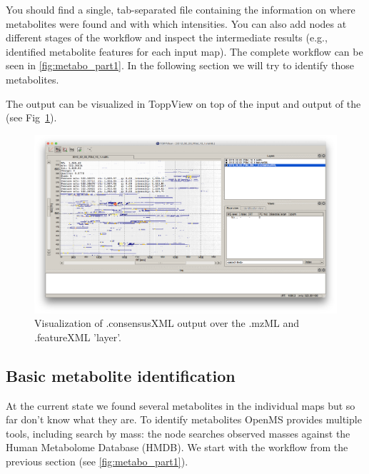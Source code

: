 You should find a single, tab-separated file containing the information on where metabolites were found and with which intensities.
You can also add  nodes at different stages of the workflow and inspect the intermediate results (e.g., identified metabolite features for each input map).
The complete workflow can be seen in \cref{fig:metabo_part1}.
In the following section we will try to identify those metabolites.

\noindent The  output can be visualized in ToppView on top of the input and output of the  (see Fig~\ref{fig:ToppView_5}). 

\begin{figure}[htbp]
  \centering
  \includegraphics[width=\textwidth]{graphics/metabo/ToppView_5.png}
  \caption{Visualization of .consensusXML output over the .mzML and .featureXML 'layer'. }
  \label{fig:ToppView_5}
\end{figure}

\subsection{Basic metabolite identification}

At the current state we found several metabolites in the individual maps but so far don't know what they are.
To identify metabolites OpenMS provides multiple tools, including search by mass: the  node searches observed masses against the Human Metabolome Database (HMDB)\cite{Wishart2007,Wishart2009,Wishart2013}.
We start with the workflow from the previous section (see \cref{fig:metabo_part1}).

